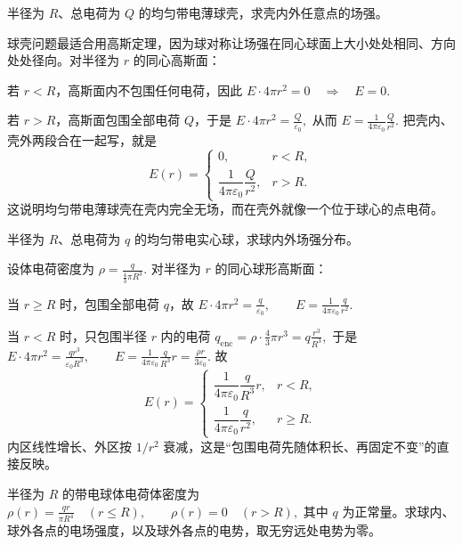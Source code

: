 \documentclass[lang=cn,11pt]{elegantbook}
\begin{document}
\begin{exercise}[均匀带电球壳的场强分布]
半径为 \(R\)、总电荷为 \(Q\) 的均匀带电薄球壳，求壳内外任意点的场强。
\end{exercise}

\begin{solution}
球壳问题最适合用高斯定理，因为球对称让场强在同心球面上大小处处相同、方向处处径向。对半径为 \(r\) 的同心高斯面：

若 \(r<R\)，高斯面内不包围任何电荷，因此
 \(E\cdot 4\pi r^2=0 \quad\Longrightarrow\quad E=0.\) 

若 \(r>R\)，高斯面包围全部电荷 \(Q\)，于是
 \(E\cdot 4\pi r^2=\frac{Q}{\varepsilon_0},\) 
从而
 \(E=\frac{1}{4\pi\varepsilon_0}\frac{Q}{r^2}.\) 
把壳内、壳外两段合在一起写，就是
\[
E(r)=
\begin{cases}
0, & r<R,\\[4pt]
\dfrac{1}{4\pi\varepsilon_0}\dfrac{Q}{r^2}, & r>R.
\end{cases}
\]
这说明均匀带电薄球壳在壳内完全无场，而在壳外就像一个位于球心的点电荷。
\end{solution}

\begin{exercise}[均匀带电实心球的场强分布]
半径为 \(R\)、总电荷为 \(q\) 的均匀带电实心球，求球内外场强分布。
\end{exercise}

\begin{solution}
设体电荷密度为
 \(\rho=\frac{q}{\frac43\pi R^3}.\) 
对半径为 \(r\) 的同心球形高斯面：

当 \(r\ge R\) 时，包围全部电荷 \(q\)，故
 \(E\cdot 4\pi r^2=\frac{q}{\varepsilon_0}, \qquad E=\frac{1}{4\pi\varepsilon_0}\frac{q}{r^2}.\) 

当 \(r<R\) 时，只包围半径 \(r\) 内的电荷
 \(q_{\mathrm{enc}}=\rho\cdot \frac43\pi r^3=q\frac{r^3}{R^3},\) 
于是
 \(E\cdot 4\pi r^2=\frac{q r^3}{\varepsilon_0 R^3}, \qquad E=\frac{1}{4\pi\varepsilon_0}\frac{q}{R^3}r =\frac{\rho r}{3\varepsilon_0}.\) 
故
\[
E(r)=
\begin{cases}
\dfrac{1}{4\pi\varepsilon_0}\dfrac{q}{R^3}r, & r<R,\\[6pt]
\dfrac{1}{4\pi\varepsilon_0}\dfrac{q}{r^2}, & r\ge R.
\end{cases}
\]
内区线性增长、外区按 \(1/r^2\) 衰减，这是“包围电荷先随体积长、再固定不变”的直接反映。
\end{solution}

\begin{exercise}
半径为 \(R\) 的带电球体电荷体密度为
 \(\rho(r)=\frac{qr}{\pi R^4}\quad (r\le R),\qquad \rho(r)=0\quad (r>R),\) 
其中 \(q\) 为正常量。求球内、球外各点的电场强度，以及球外各点的电势，取无穷远处电势为零。
\end{exercise}
\end{document}
